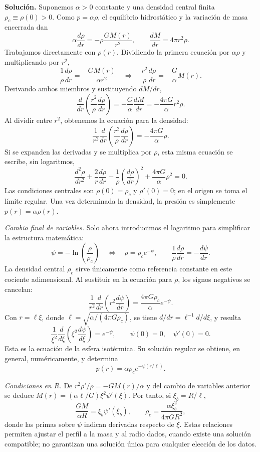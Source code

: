 \begin{enumerate}
\textbf{Solución.} Suponemos $\alpha>0$ constante y una densidad central finita $\rho_c\equiv\rho(0)>0$. Como $p=\alpha\rho$, el equilibrio hidrostático y la variación de masa encerrada dan
$$
\alpha\frac{d\rho}{dr}=-\rho\frac{GM(r)}{r^2},
\qquad \frac{dM}{dr}=4\pi r^2\rho.
$$
Trabajamos directamente con $\rho(r)$. Dividiendo la primera ecuación por $\alpha\rho$ y multiplicando por $r^2$,
$$
\frac{1}{\rho}\frac{d\rho}{dr}=-\frac{GM(r)}{\alpha r^2}
\quad\Longrightarrow\quad
\frac{r^2}{\rho}\frac{d\rho}{dr}=-\frac{G}{\alpha}M(r).
$$
Derivando ambos miembros y sustituyendo $dM/dr$,
$$
\frac{d}{dr}\left(\frac{r^2}{\rho}\frac{d\rho}{dr}\right)
=-\frac{G}{\alpha}\frac{dM}{dr}
=-\frac{4\pi G}{\alpha}r^2\rho.
$$
Al dividir entre $r^2$, obtenemos la ecuación para la densidad:
$$
\boxed{
\frac{1}{r^2}\frac{d}{dr}\left(\frac{r^2}{\rho}\frac{d\rho}{dr}\right)
=-\frac{4\pi G}{\alpha}\rho
}.
$$
Si se expanden las derivadas y se multiplica por $\rho$, esta misma ecuación se escribe, sin logaritmos,
$$
\frac{d^2\rho}{dr^2}+\frac{2}{r}\frac{d\rho}{dr}
-\frac{1}{\rho}\left(\frac{d\rho}{dr}\right)^2
+\frac{4\pi G}{\alpha}\rho^2=0.
$$
Las condiciones centrales son $\rho(0)=\rho_c$ y $\rho'(0)=0$; en el origen se toma el límite regular. Una vez determinada la densidad, la presión es simplemente $p(r)=\alpha\rho(r)$.

\textit{Cambio final de variables.} Solo ahora introducimos el logaritmo para simplificar la estructura matemática:
$$
\psi=-\ln\!\left(\frac{\rho}{\rho_c}\right)
\quad\Longleftrightarrow\quad
\rho=\rho_c e^{-\psi},
\qquad
\frac{1}{\rho}\frac{d\rho}{dr}=-\frac{d\psi}{dr}.
$$
La densidad central $\rho_c$ sirve únicamente como referencia constante en este cociente adimensional. Al sustituir en la ecuación para $\rho$, los signos negativos se cancelan:
$$
\frac{1}{r^2}\frac{d}{dr}\left(r^2\frac{d\psi}{dr}\right)
=\frac{4\pi G\rho_c}{\alpha}e^{-\psi}.
$$
Con $r=\ell\xi$, donde $\ell=\sqrt{\alpha/(4\pi G\rho_c)}$, se tiene $d/dr=\ell^{-1}d/d\xi$, y resulta
$$
\boxed{
\frac{1}{\xi^2}\frac{d}{d\xi}\left(\xi^2\frac{d\psi}{d\xi}\right)
=e^{-\psi}
},\qquad \psi(0)=0,\quad \psi'(0)=0.
$$
Esta es la ecuación de la esfera isotérmica. Su solución regular se obtiene, en general, numéricamente, y determina
$$
\boxed{p(r)=\alpha\rho_c e^{-\psi(r/\ell)}}.
$$

\textit{Condiciones en $R$.} De $r^2\rho'/\rho=-GM(r)/\alpha$ y del cambio de variables anterior se deduce $M(r)=(\alpha\ell/G)\xi^2\psi'(\xi)$. Por tanto, si $\xi_b=R/\ell$,
$$
\frac{GM}{\alpha R}=\xi_b\psi'(\xi_b),
\qquad
\rho_c=\frac{\alpha\xi_b^2}{4\pi GR^2},
$$
donde las primas sobre $\psi$ indican derivadas respecto de $\xi$. Estas relaciones permiten ajustar el perfil a la masa y al radio dados, cuando existe una solución compatible; no garantizan una solución única para cualquier elección de los datos.


\end{enumerate}
